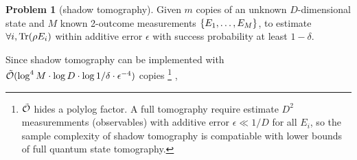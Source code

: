 \documentclass[
aps,
pra,
twocolumn,
floatfix,
]{revtex4-2}
\theoremstyle{plain}
\newtheorem{theorem}{Theorem}
\theoremstyle{definition}
\newtheorem{problem}{Problem}
\newcommand{\ob}{O}
\newcommand{\dm}{\rho}
\begin{document}
\begin{problem}[shadow tomography]\label{prm:shadow_tomography}
	Given $m$ copies of an unknown $D$-dimensional state and $M$ known 2-outcome measurements $\qty{E_1,\dots,E_M}$,
	to estimate $\forall i,\Tr(\dm E_i)$ within additive error $\epsilon$ with success probability at least $1-\delta$.
\end{problem}
Since shadow tomography can be implemented with $\tilde{\mathcal{O}}(\log^4 M\cdot \log D\cdot \log 1/\delta \cdot\epsilon^{-4})$ copies \footnote{$\tilde{\mathcal{O}}$ hides a polylog factor. A full tomography require estimate $D^2$ measuremments (observables) with additive error $\epsilon\ll 1/D$ for all $E_i$, so the sample complexity of shadow tomography is compatiable with lower bounds of full quantum state tomography.} \cite{aaronsonShadowTomographyQuantum2018},
\end{document}
